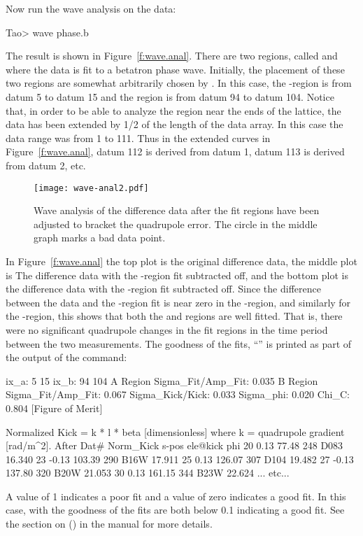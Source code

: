 \documentclass{hitec}     %
\begin{document}
Now run the wave analysis on the  data:
\begin{code}
Tao> wave phase.b
\end{code}
The result is shown in Figure~\ref{f:wave.anal}. There are two regions, called  and 
where the data is fit to a betatron phase wave\cite{b:phase.coupling.correction}. Initially, the
placement of these two regions are somewhat arbitrarily chosen by \tao. In this case, the
-region is from datum 5 to datum 15 and the  region is from datum 94 to datum
104. Notice that, in order to be able to analyze the region near the ends of the lattice, the data
has been extended by 1/2 of the length of the data array. In this case the  data range
was from 1 to 111. Thus in the extended curves in Figure~\ref{f:wave.anal}, datum 112 is derived
from datum 1, datum 113 is derived from datum 2, etc.

\begin{figure}[tb]
  \centering
  \texttt{[image: wave-anal2.pdf]}
  \caption{
Wave analysis of the  difference data after the fit regions have been adjusted to bracket
the quadrupole error. The circle in the middle graph marks a bad data point.
  }
  \label{f:wave.anal2}
\end{figure}

In Figure~\ref{f:wave.anal} the top plot is the original  difference data, the middle
plot is The difference data with the -region fit subtracted off, and the bottom plot is the
difference data with the -region fit subtracted off. Since the difference between the data and
the -region fit is near zero in the -region, and similarly for the -region, this
shows that both the  and  regions are well fitted. That is, there were no significant
quadrupole changes in the fit regions in the time period between the two measurements. The goodness
of the fits, ``'' is printed as part of the output of the  command:
\begin{code}
ix_a:   5  15
ix_b:  94 104
A Region Sigma_Fit/Amp_Fit:     0.035
B Region Sigma_Fit/Amp_Fit:     0.067
Sigma_Kick/Kick:    0.033
Sigma_phi:          0.020
Chi_C:              0.804 [Figure of Merit]

Normalized Kick = k * l * beta [dimensionless]
   where k = quadrupole gradient [rad/m^2].
After Dat#    Norm_Kick     s-pos   ele@kick                       phi
       20          0.13     77.48   248   D083                    16.340
       23         -0.13    103.39   290   B16W                    17.911
       25          0.13    126.07   307   D104                    19.482
       27         -0.13    137.80   320   B20W                    21.053
       30          0.13    161.15   344   B23W                    22.624
... etc...
\end{code}
A value of 1 indicates a poor fit and a value of zero indicates a good fit. In this case, with the
goodness of the fits are both below 0.1 indicating a good fit. See the section on  () in the \tao manual for more details.
\end{document}
